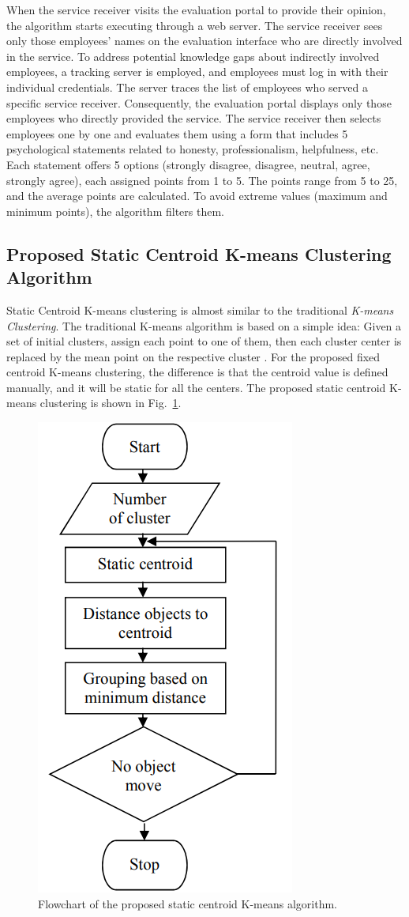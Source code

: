 \documentclass[conference]{IEEEtran}
\begin{document}
When the service receiver visits the evaluation portal to provide their opinion, the algorithm starts executing through a web server. The service receiver sees only those employees' names on the evaluation interface who are directly involved in the service. To address potential knowledge gaps about indirectly involved employees, a tracking server is employed, and employees must log in with their individual credentials. The server traces the list of employees who served a specific service receiver. Consequently, the evaluation portal displays only those employees who directly provided the service. The service receiver then selects employees one by one and evaluates them using a form that includes 5 psychological statements related to honesty, professionalism, helpfulness, etc. Each statement offers 5 options (strongly disagree, disagree, neutral, agree, strongly agree), each assigned points from 1 to 5. The points range from 5 to 25, and the average points are calculated. To avoid extreme values (maximum and minimum points), the algorithm filters them.

\subsection{Proposed Static Centroid K-means Clustering Algorithm}

Static Centroid K-means clustering is almost similar to the traditional \textit{K-means Clustering}. The traditional K-means algorithm is based on a simple idea: Given a set of initial clusters, assign each point to one of them, then each cluster center is replaced by the mean point on the respective cluster \cite{ref12}. For the proposed fixed centroid K-means clustering, the difference is that the centroid value is defined manually, and it will be static for all the centers. The proposed static centroid K-means clustering is shown in Fig.~\ref{fig:static-k-means}.

\begin{figure}[h]
  \centering
    \includegraphics[width=0.35\linewidth]{flowchart1.png}
  \caption{Flowchart of the proposed static centroid K-means algorithm.}
  \label{fig:static-k-means}
\end{figure}
\end{document}
